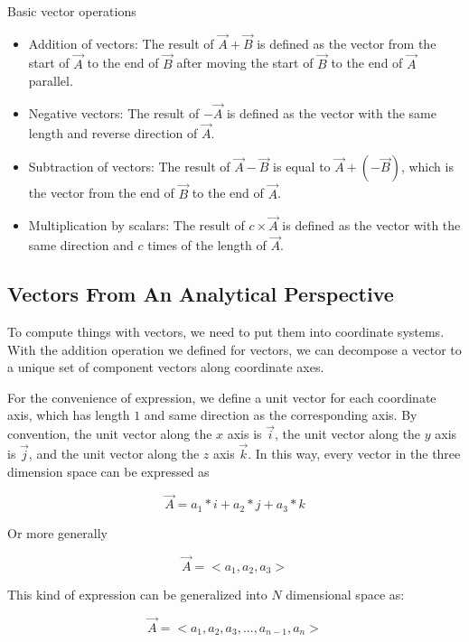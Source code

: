 \documentclass{article}
\begin{document}
Basic vector operations
\begin{itemize}
	\item Addition of vectors: The result of $\vec{A} + \vec{B}$ is defined as
	the vector from the start of $\vec{A}$ to the end of $\vec{B}$ after
	moving the start of $\vec{B}$ to the end of $\vec{A}$ parallel.
	
	\item Negative vectors: The result of $-\vec{A}$ is defined as the vector
	with the same length and reverse direction of $\vec{A}$.
	
	\item Subtraction of vectors: The result of $\vec{A} - \vec{B}$ is equal to
	$\vec{A} + (-\vec{B})$, which is the vector from the end of $\vec{B}$ to
	the end of $\vec{A}$.
	
	\item Multiplication by scalars: The result of $c \times \vec{A}$ is
	defined as the vector with the same direction and $c$ times of the length
	of $\vec{A}$. 
\end{itemize}

\bigskip

\subsection{Vectors From An Analytical Perspective}

To compute things with vectors, we need to put them into coordinate systems.
With the addition operation we defined for vectors, we can decompose a vector
to a unique set of component vectors along coordinate axes.

For the convenience of expression, we define a unit vector for each coordinate
axis, which has length $1$ and same direction as the corresponding axis. By
convention, the unit vector along the $x$ axis is $\vec{i}$, the unit vector
along the $y$ axis is $\vec{j}$, and the unit vector along the $z$ axis
$\vec{k}$. In this way, every vector in the three dimension space can be
expressed as

\[ \vec{A} = a_{1} * i + a_{2} * j + a_{3} * k \]

Or more generally

\[ \vec{A} = <a_{1}, a_{2}, a_{3}> \]

This kind of expression can be generalized into $N$ dimensional space as:

\[ \vec{A} = <a_{1}, a_{2}, a_{3}, ..., a_{n-1}, a_{n}> \]

\bigskip
\end{document}
